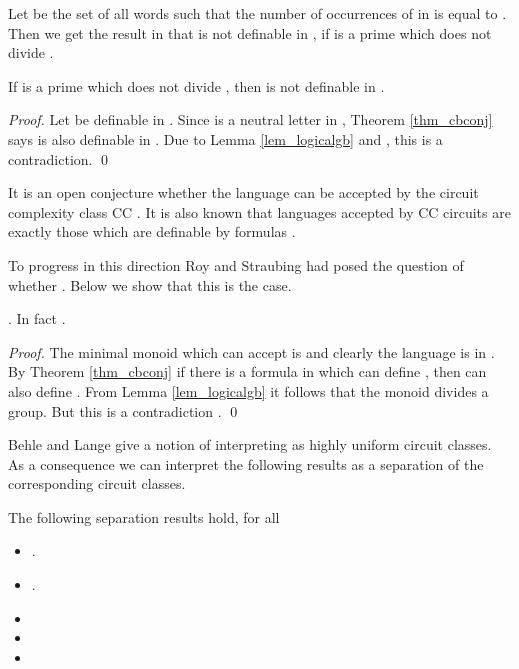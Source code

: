 \documentclass[envcountsame]{llncs}
\begin{document}
Let  be the set of all words  such that the number of occurrences of  in  is equal to . Then we
get the result in \cite{roy_defGenFO} that  is not definable in , if  is a prime which does not divide
.
\begin{corollary}
  If  is a prime which does not divide , then  is not definable in .
\end{corollary}
\begin{proof}
  Let  be definable in . Since  is a neutral letter in , Theorem \ref{thm_cbconj} says
   is also definable in .  Due to Lemma \ref{lem_logicalgb} and \cite{str_cirBook}, this is a contradiction.
\qed \end{proof}

It is an open conjecture whether the language  can be accepted by the circuit complexity class CC \cite{str_cirBook}. It is also known that languages accepted by CC circuits are exactly those which are definable by  formulas \cite{vollmer_book}. 

To progress in this direction Roy and Straubing \cite{roy_defGenFO} had posed the question of whether . Below we show that this is the case. 


\begin{corollary}
 . In fact .
\end{corollary}
\begin{proof}
  The minimal monoid which can accept  is  and clearly the language is in . By Theorem \ref{thm_cbconj} if
  there is a formula in  which can define , then  can also define .
  From Lemma \ref{lem_logicalgb} it follows that the monoid  divides a group. But this is a contradiction \cite{str_cirBook}.
\qed \end{proof}

Behle and Lange \cite{behle_foLessUniform} give a notion of interpreting  as highly uniform circuit classes.  As a consequence we can interpret the following results as a separation of the corresponding circuit classes.
\begin{corollary}
The following separation results hold, for all 
\begin{itemize}
\item .
\item .
\item 
\item 
\item 
\end{itemize}
\end{corollary}
\end{document}
